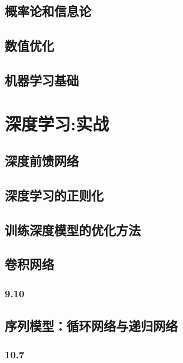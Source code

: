 \documentclass[a4paper,11pt]{book}
\begin{document}
\chapter{概率论和信息论}
\label{chap:3}

\chapter{数值优化}
\label{chap:4}

\chapter{机器学习基础}
\label{chap:5}

\part{深度学习:实战}
\label{part:2}

\chapter{深度前馈网络}
\label{chap:6}

\chapter{深度学习的正则化}
\label{chap:7}

\chapter{训练深度模型的优化方法}
\label{chap:8}

\chapter{卷积网络}
\label{chap:9}


\section{9.10}
\label{sec:9.10}

\chapter{序列模型：循环网络与递归网络}
\label{chap:10}

\section{10.7}
\label{sec:10.7}
\end{document}

